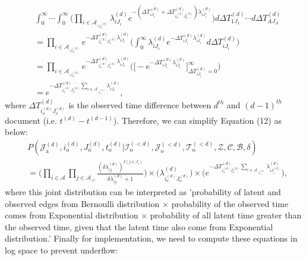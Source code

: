 \documentclass[a4paper]{article}
\begin{document}
\begin{equation}
\begin{aligned}
&\int_{0}^\infty\cdots\int_{0}^\infty \Big(\prod_{i\in \mathcal{A}_{\backslash i_o^{(d)}}} \lambda^{(d)}_{iJ_i}e^{-(\Delta T^{(d)}_{iJ_i} + \Delta T^{(d)}_{i_o^{(d)}J_o^{(d)}})\lambda^{(d)}_{iJ_i}} \Big)d\Delta T^{(d)}_{1J_1}\cdots d\Delta T^{(d)}_{AJ_A}\\&
= \prod_{i\in \mathcal{A}_{\backslash i_o^{(d)}}} e^{- \Delta T^{(d)}_{i_o^{(d)}J_o^{(d)}}\lambda^{(d)}_{iJ_i}} \Big(\int_{0}^\infty \lambda^{(d)}_{iJ_i}e^{-\Delta T^{(d)}_{iJ_i} \lambda^{(d)}_{iJ_i}}  d\Delta T^{(d)}_{iJ_i}\Big)
\\& =\prod_{i\in \mathcal{A}_{\backslash i_o^{(d)}}} e^{- \Delta T^{(d)}_{i_o^{(d)}J_o^{(d)}}\lambda^{(d)}_{iJ_i}} \Big(\Big [ - e^{-\Delta T^{(d)}_{iJ_i} \lambda^{(d)}_{iJ_i}}\Big]_{\Delta T^{(d)}_{iJ_i}  = 0} ^{\infty}\Big)
\\& = e^{- \Delta T^{(d)}_{i_o^{(d)}J_o^{(d)}}\sum_{i\in \mathcal{A}_{\backslash i_o^{(d)}}}\lambda^{(d)}_{iJ_i}},
\end{aligned}
\end{equation}
where $\Delta T^{(d)}_{i_o^{(d)}J_o^{(d)}}$ is the observed time difference between $d^{th}$ and $(d-1)^{th}$ document (i.e. $t^{(d)}-t^{(d-1)}$).
Therefore, we can simplify Equation (12) as below:
  \begin{equation}
  \begin{aligned}
  &P(\mathcal{J}^{(d)}_{\mbox{a}}, i^{(d)}_{\mbox{o}}, J^{(d)}_{\mbox{o}}, t^{(d)}_{\mbox{o}} |\mathcal{I}^{(<d)}_{\mbox{o}}, \mathcal{J}^{(<d)}_{\mbox{o}}, \mathcal{T}^{(<d)}_{\mbox{o}}, \mathcal{Z}, \mathcal{C}, \mathcal{B}, \delta)\\&=\Big(\prod_{i\in \mathcal{A}}\prod_{j \in \mathcal{A}_{\backslash i }} \frac{(\delta\lambda^{(d)}_{ij})^{I(j \in J_i)}}{\delta\lambda^{(d)}_{ij}+1}\Big)\times \Big(\lambda^{(d)}_{i_o^{(d)}J_{o}^{(d)}}\Big)\times  \Big(e^{-\Delta T^{(d)}_{i_o^{(d)}J_o^{(d)}}\sum\limits_{i\in \mathcal{A}_{\backslash i_o^{(d)}}}\lambda^{(d)}_{iJ^{(d)}_{i}}}\Big),
  \end{aligned}
  \end{equation}
where this joint distribution can be interpreted as 'probability of latent and observed edges from Bernoulli distribution $\times$ probability of the observed time comes from Exponential distribution $\times$ probability of all latent time greater than the observed time, given that the latent time also come from Exponential distribution.'
Finally for implementation, we need to compute these equations in log space to prevent underflow:
\end{document}

